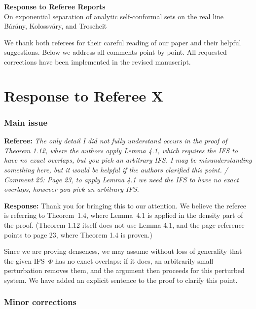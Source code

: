 \documentclass[11pt]{article}
\newcommand{\referee}[1]{\textbf{Referee:} \textit{#1}}
\newcommand{\response}[1]{\textbf{Response:} #1}
\begin{document}
\begin{center}
  {\Large\bfseries Response to Referee Reports}\\[6pt]
  {\large On exponential separation of analytic self-conformal sets on the real line}\\[4pt]
  B\'ar\'any, Kolossv\'ary, and Troscheit
\end{center}

\bigskip

\noindent We thank both referees for their careful reading of our paper and their helpful suggestions.
Below we address all comments point by point.  All requested corrections have been implemented in
the revised manuscript.

\bigskip

\part*{Response to Referee X}

\section*{Main issue}

\referee{The only detail I did not fully understand occurs in the proof of Theorem 1.12, where the
authors apply Lemma 4.1, which requires the IFS to have no exact overlaps, but you pick an arbitrary
IFS. I may be misunderstanding something here, but it would be helpful if the authors clarified this
point. / Comment 25: Page 23, to apply Lemma 4.1 we need the IFS to have no exact overlaps,
however you pick an arbitrary IFS. }

\response{Thank you for bringing this to our attention. We believe the referee is referring to Theorem~1.4,
where Lemma~4.1 is applied in the density part of the proof. (Theorem 1.12 itself does not use Lemma
4.1, and the page reference points to page 23, where Theorem 1.4 is proven.)

Since we are proving denseness, we may assume without loss of
generality that the given IFS~$\Phi$ has no exact overlaps: if it does, an arbitrarily small
perturbation removes them, and the argument then proceeds for this perturbed system. We have added
an explicit sentence to the proof to clarify this point.}

\section*{Minor corrections}
\end{document}
